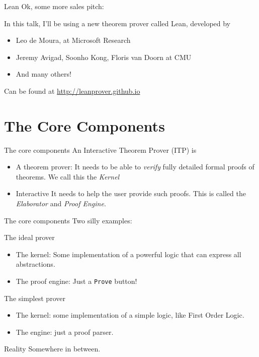 \documentclass{beamer}
\newcommand{\ttt}[1]{\texttt{#1}}
\begin{document}
\begin{frame}{Lean}
  Ok, some more sales pitch:\bigskip

  In this talk, I'll be using a new theorem prover called Lean, developed by
  \begin{itemize}
  \item Leo de Moura, at Microsoft Research
  \item Jeremy Avigad, Soonho Kong, Floris van Doorn at CMU
  \item And many others!
  \end{itemize}

  Can be found at \url{http://leanprover.github.io}
\end{frame}
  
\section{The Core Components}

\begin{frame}{The core components}
  An Interactive Theorem Prover (ITP) is
  \begin{itemize}
  \item
    \begin{block}{A theorem prover:}
      It needs to be able to \emph{verify} fully detailed formal
      proofs of theorems. We call this the \emph{Kernel}
    \end{block}
  \item
    \begin{block}{Interactive}
      It needs to help the user provide such proofs. This is called
      the \emph{Elaborator} and \emph{Proof Engine}.
    \end{block}
  \end{itemize}
\end{frame}

\begin{frame}{The core components}
  Two silly examples:
  \begin{block}{The ideal prover}
    \begin{itemize}
    \item The kernel: Some implementation of a powerful logic that can express all abstractions.
    \item The proof engine: Just a \ttt{Prove} button!
    \end{itemize}
  \end{block}
  \begin{block}{The simplest prover}
    \begin{itemize}
    \item The kernel: some implementation of a simple logic, like First Order Logic.
    \item The engine: just a proof parser.
    \end{itemize}
  \end{block}
  \begin{block}{Reality}
    Somewhere in between.
  \end{block}
\end{frame}
\end{document}
